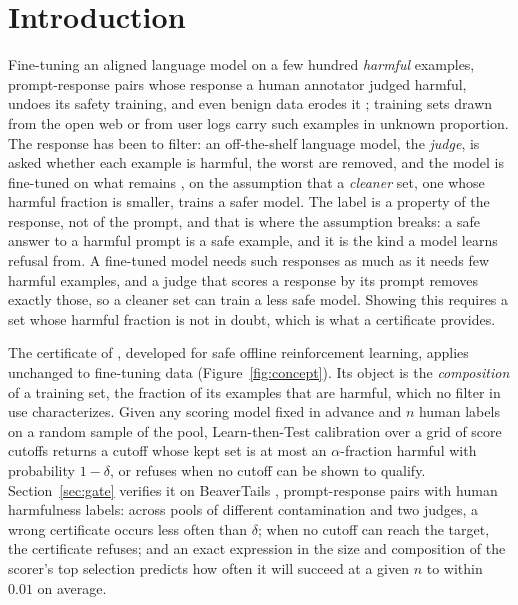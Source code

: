 \documentclass{article} %
\begin{document}
\section{Introduction}
\label{sec:intro}
Fine-tuning an aligned language model on a few hundred \emph{harmful} examples, prompt-response pairs whose response a human annotator judged harmful, undoes its safety training, and even benign data erodes it \citep{qi2024finetuning}; training sets drawn from the open web or from user logs carry such examples in unknown proportion. The response has been to filter: an off-the-shelf language model, the \emph{judge}, is asked whether each example is harmful, the worst are removed, and the model is fine-tuned on what remains \citep{huang2024survey, choi2024saft, shen2025seal}, on the assumption that a \emph{cleaner} set, one whose harmful fraction is smaller, trains a safer model. The label is a property of the response, not of the prompt, and that is where the assumption breaks: a safe answer to a harmful prompt is a safe example, and it is the kind a model learns refusal from. A fine-tuned model needs such responses as much as it needs few harmful examples, and a judge that scores a response by its prompt removes exactly those, so a cleaner set can train a less safe model. Showing this requires a set whose harmful fraction is not in doubt, which is what a certificate provides.

The certificate of \citet{haroon2026certified}, developed for safe offline reinforcement learning, applies unchanged to fine-tuning data (Figure~\ref{fig:concept}). Its object is the \emph{composition} of a training set, the fraction of its examples that are harmful, which no filter in use characterizes. Given any scoring model fixed in advance and $n$ human labels on a random sample of the pool, Learn-then-Test calibration \citep{angelopoulos2025ltt} over a grid of score cutoffs returns a cutoff whose kept set is at most an $\alpha$-fraction harmful with probability $1 - \delta$, or refuses when no cutoff can be shown to qualify. Section~\ref{sec:gate} verifies it on BeaverTails \citep{ji2023beavertails}, prompt-response pairs with human harmfulness labels: across pools of different contamination and two judges, a wrong certificate occurs less often than $\delta$; when no cutoff can reach the target, the certificate refuses; and an exact expression in the size and composition of the scorer's top selection predicts how often it will succeed at a given $n$ to within $0.01$ on average.
\end{document}
